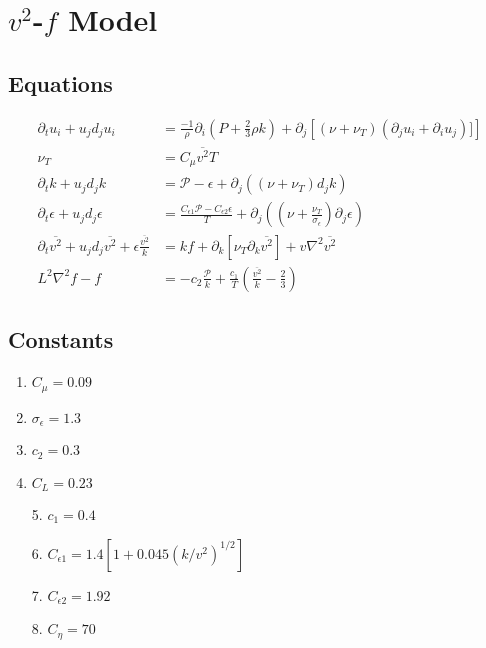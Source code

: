 \documentclass[12pt]{article}
\newcommand{\ep}{\epsilon} \newcommand{\noi}{\noindent}
\newcommand{\pr}{\partial}
\begin{document}
 
\thispagestyle{fancy} 

\section{$v^2$-$f$ Model}

\subsection{Equations} 
\begin{align}
	\pr_t u_i + u_j d_j u_i &= \frac{-1}{\rho} \pr_i \left( P +
	\frac{2}{3} \rho k \right) + \pr_j \left[ (\nu + \nu_T)(\pr_j u_i + \pr_i
	u_j)]\right] \\
	\nu_T &= C_\mu \overline{v^2} T \\ 
	\pr_t k + u_j d_j k &= \mathcal{P}- \ep + \pr_j \left( (\nu +\nu_T)d_j
	k\right)\\
	\pr_t \ep + u_j d_j \ep &= \frac{C_{\ep 1}\mathcal{P} - C_{\ep 2}
	\ep}{T} + \pr_j \left( (\nu + \frac{\nu_T}{\sigma_\ep}) \pr_j \ep \right)\\
	\pr_t \overline{v^2} + u_j d_j \overline{v^2} + \ep
	\frac{\overline{v^2}}{k} &= kf + \pr_k [ \nu_T \pr_k \overline{v^2}] + v
	\nabla^2 \overline{v^2} \\
	L^2 \nabla^2 f - f &= -c_2 \frac{\mathcal{P}}{k} + \frac{c_1}{T} \left(
	\frac{\overline{v^2}}{k} - \frac{2}{3} \right) 
	\label{eq:v2f}
\end{align}

\subsection{Constants} 

\begin{multicols}{2}
\begin{enumerate}
	\item $C_\mu = 0.09$
	\item $\sigma_\ep = 1.3$
	\item $c_2 = 0.3$	
	\item $C_L = 0.23$
\end{enumerate}
\columnbreak 

\begin{itemize}
	\item[5.] $c_1 = 0.4$
	\item[6.] $C_{\ep 1} = 1.4[1 + 0.045 (k/v^2)^{1/2}]$
	\item[7.] $C_{\ep 2} = 1.92$  
	\item[8.] $C_\eta = 70$
\end{itemize}
\end{multicols}
\end{document}
